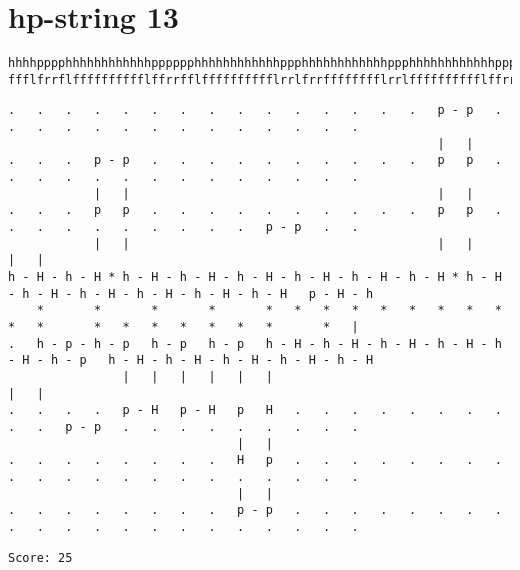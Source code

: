 \documentclass[a4paper,oneside,article,11pt]{memoir}
\begin{document}
\pagebreak

\section*{hp-string 13}
\begin{lstlisting}[basicstyle=\fontsize{7}{11}\ttfamily]
hhhhpppphhhhhhhhhhhhpppppphhhhhhhhhhhhppphhhhhhhhhhhhppphhhhhhhhhhhhppphpphhpphhpphph
ffflfrrflfffffffffflffrrfflfffffffffflrrlfrrfffffffflrrlfffffffffflffrrffllrrllrrlff
\end{lstlisting}
\begin{lstlisting}[basicstyle=\fontsize{4}{11}\ttfamily]
.   .   .   .   .   .   .   .   .   .   .   .   .   .   .   p - p   .   .   .   .   .   .   .   .   .   .   .   .   .   .
                                                            |   |
.   .   .   p - p   .   .   .   .   .   .   .   .   .   .   p   p   .   .   .   .   .   .   .   .   .   .   .   .   .   .
            |   |                                           |   |
.   .   .   p   p   .   .   .   .   .   .   .   .   .   .   p   p   .   .   .   .   .   .   .   .   .   .   p - p   .   .
            |   |                                           |   |                                           |   |
h - H - h - H * h - H - h - H - h - H - h - H - h - H - h - H * h - H - h - H - h - H - h - H - h - H - h - H   p - H - h
    *       *       *       *       *   *   *   *   *   *   *   *   *   *   *       *   *   *   *   *   *   *       *   |
.   h - p - h - p   h - p   h - p   h - H - h - H - h - H - h - H - h - H - h - p   h - H - h - H - h - H - h - H - h - H
                |   |   |   |   |   |                                           |   |
.   .   .   .   p - H   p - H   p   H   .   .   .   .   .   .   .   .   .   .   p - p   .   .   .   .   .   .   .   .   .
                                |   |
.   .   .   .   .   .   .   .   H   p   .   .   .   .   .   .   .   .   .   .   .   .   .   .   .   .   .   .   .   .   .
                                |   |
.   .   .   .   .   .   .   .   p - p   .   .   .   .   .   .   .   .   .   .   .   .   .   .   .   .   .   .   .   .   .
\end{lstlisting}
\begin{lstlisting}
Score: 25
\end{lstlisting}


\pagebreak
\end{document}
